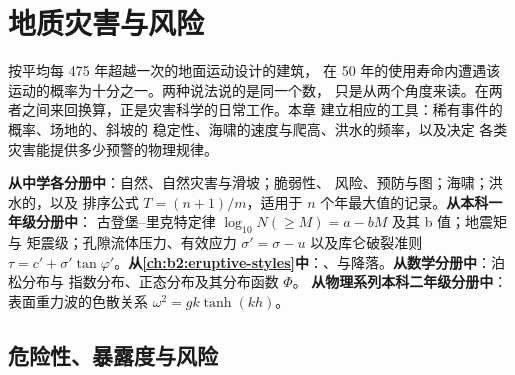 \chapter{地质灾害与风险}\label{ch:b2:geological-hazards}

按平均每 475 年超越一次的地面运动设计的建筑，
在 50 年的使用寿命内遭遇该运动的概率为十分之一。两种说法说的是同一个数，
只是从两个角度来读。在两者之间来回换算，正是灾害科学的日常工作。本章
建立相应的工具：稀有事件的概率、场地的、斜坡的
稳定性、海啸的速度与爬高、洪水的频率，以及决定
各类灾害能提供多少预警的物理规律。

\begin{recall}
\textbf{从中学各分册中}：自然、自然灾害与滑坡；脆弱性、
风险、预防与图；海啸；洪水的，以及
排序公式 $T = (n + 1)/m$，适用于 $n$ 个年最大值的记录。\textbf{从本科一年级分册中}：
古登堡–里克特定律 $\log_{10} N(\geq M) = a - bM$ 及其 b 值；地震矩与
矩震级；孔隙流体压力、有效应力 $\sigma' = \sigma - u$ 以及库仑破裂准则
$\tau = c' + \sigma' \tan\varphi'$。\textbf{从\cref{ch:b2:eruptive-styles}中}：、与降落。\textbf{从数学分册中}：泊松分布与
指数分布、正态分布及其分布函数 $\Phi$。
\textbf{从物理系列本科二年级分册中}：表面重力波的色散关系
$\omega^2 = gk\tanh(kh)$。
\end{recall}

\section{危险性、暴露度与风险}\label{sec:b2:geological-hazards:risk}

